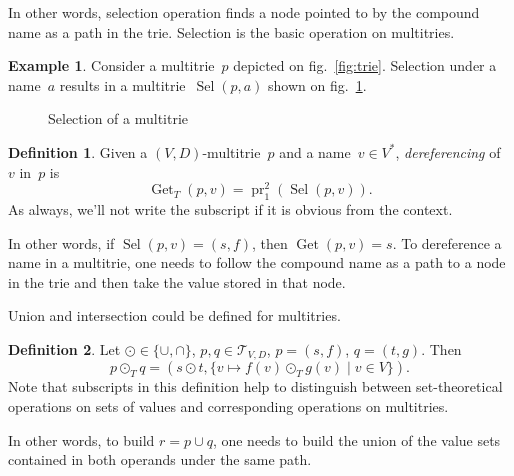 \documentclass{article}
\theoremstyle{definition}
\newtheorem{Df}{Definition}
\newtheorem{Ex}{Example}
\newcommand{\setcharmt}{T}
\newcommand{\setsymbol}[3]{\mathcal{#1}_{#2,#3}}
\newcommand{\setmt}[2]{\setsymbol{\setcharmt}{#1}{#2}}
\newcommand{\select}{\operatorname{Sel}}
\newcommand{\deref}{\operatorname{Get}}
\newcommand{\proj}[2]{\operatorname{pr}^{#1}_{#2}}
\begin{document}
In other words, selection operation finds a node pointed to by the
compound name as a path in the trie.
Selection is the basic operation on multitries.

\begin{Ex}\label{ex:mt-select}
Consider a multitrie~$p$ depicted on fig.~\ref{fig:trie}. Selection under a
name~$a$ results in a multitrie~$\select(p,a)$ shown on
fig.~\ref{fig:mt-select}.
\end{Ex}

\begin{figure}[ht]
\begin{center}
\begin{minipage}{17em}
\end{minipage}
\end{center}
\caption{Selection of a multitrie}\label{fig:mt-select}
\end{figure}

\begin{Df}\label{df:mt-deref}
Given a $(V,D)$-multitrie~$p$ and a name~$v\in V^\ast$, \emph{dereferencing}
of~$v$ in~$p$ is
\[
  \deref_\setcharmt(p, v) = \proj{2}{1}(\select(p, v)) .
\]
As always, we'll not write the subscript if it is obvious from the context.
\end{Df}

In other words, if $\select(p,v) = (s,f)$, then $\deref(p, v) = s$. To
dereference a name in a multitrie, one needs to follow the compound name
as a path to a node in the trie and then take the value stored in that node.

Union and intersection could be defined for multitries.
\begin{Df}\label{df:mt-setop}
Let $\odot \in \{ \cup, \cap \}$, $p, q \in \setmt{V}{D}$,
$p = (s,f)$, $q = (t, g)$. Then
\[
  p \odot_\setcharmt  q = (s \odot t, \{ v \mapsto f(v) \odot_\setcharmt  g(v) \mid v \in V \}) .
\]
Note that subscripts in this definition help to distinguish between
set-theoretical operations on sets of values and corresponding operations
on multitries.
\end{Df}

In other words, to build $r = p \cup q$, one needs to build the union of the
value sets contained in both operands under the same path.
\end{document}
